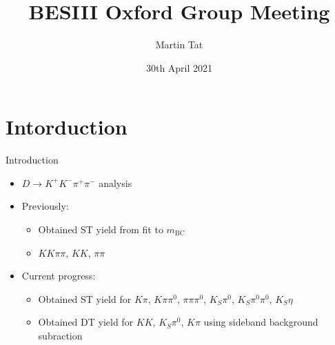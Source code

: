 \documentclass{beamer}
\title[BESIII Oxford]{BESIII Oxford Group Meeting}
\author{Martin Tat}
\institute{Oxford LHCb}
\date{30th April 2021}
\begin{document}
\begin{frame}
  \titlepage
\end{frame}


\section{Intorduction}
\begin{frame}{Introduction}
  \begin{itemize}
    \setlength\itemsep{2em}
    \item{$D\to K^+K^-\pi^+\pi^-$ analysis}
    \item{Previously:}
    \begin{itemize}
      \item{Obtained ST yield from fit to $m_\text{BC}$}
      \item{$KK\pi\pi$, $KK$, $\pi\pi$}
    \end{itemize}
    \item{Current progress:}
    \begin{itemize}
      \item{Obtained ST yield for $K\pi$, $K\pi\pi^0$, $\pi\pi\pi^0$, $K_S\pi^0$, $K_S\pi^0\pi^0$, $K_S\eta$}
      \item{Obtained DT yield for $KK$, $K_S\pi^0$, $K\pi$ using sideband background subraction}
    \end{itemize}
  \end{itemize}
\end{frame}
\end{document}
